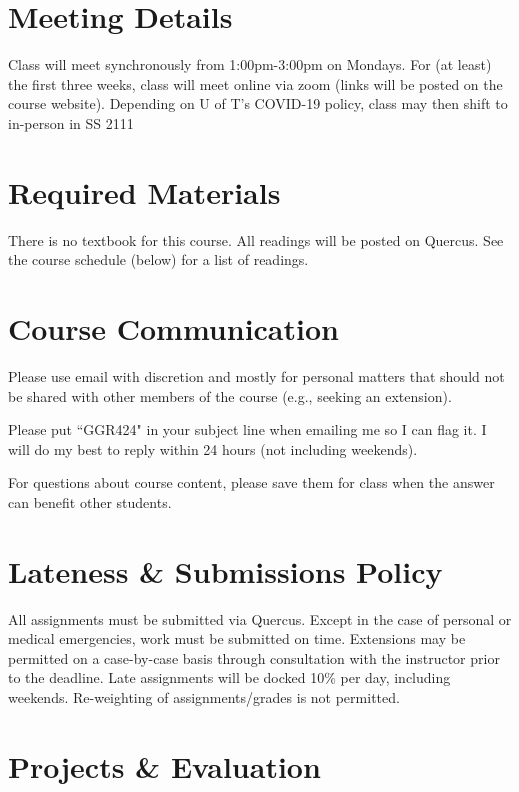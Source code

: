 \documentclass[11pt]{article}
\begin{document}
	\section*{\textsf{Meeting Details}}
	
	Class will meet synchronously from 1:00pm-3:00pm on Mondays. For (at least) the first three weeks, class will meet online via zoom (links will be posted on the course website). Depending on U of T's COVID-19 policy, class may then shift to in-person in SS 2111

	
	
	\section*{Required Materials}
	
	There is no textbook for this course. All readings will be posted on Quercus. See the course schedule (below) for a list of readings.
	
	
	\section*{Course Communication}
	
	Please use email with discretion and mostly for personal matters that should not be shared with other members of the course (e.g., seeking an extension). 
	
	Please put “GGR424" in your subject line when emailing me so I can flag it. I will do my best to reply within 24 hours (not including weekends).
	
	For questions about course content, please save them for class when the answer can benefit other students. 
	
		
	\section*{Lateness \& Submissions Policy}
	
	All assignments must be submitted via Quercus. Except in the case of personal or medical emergencies, work must be submitted on time. Extensions may be permitted on a case-by-case basis through consultation with the instructor prior to the deadline. Late assignments will be docked 10\% per day, including weekends. Re-weighting of assignments/grades is not permitted.
	
	
	
	
		
	

	\section*{Projects \& Evaluation}
	
\end{document}
